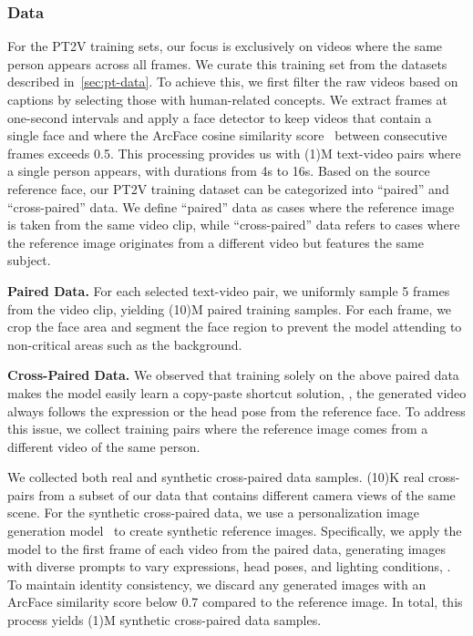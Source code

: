 \subsubsection{\Pretraining Data}
\label{sec:pt2v_pretrain}



For the PT2V training sets, our focus is exclusively on videos where the same person appears across all frames.
We curate this training set from the \OursVideo \pretraining datasets described in~\cref{sec:pt-data}.
To achieve this, we first filter the raw \textToVShort videos based on captions by selecting those with human-related concepts.
We extract frames at one-second intervals and apply a face detector to keep videos that contain a single face and where the ArcFace cosine similarity score~\citep{deng2019arcface} between consecutive frames exceeds 0.5.
This processing provides us with \bigO(1)M text-video pairs where a single person appears, with durations from 4s to 16s.
Based on the source reference face, our PT2V training dataset can be categorized into ``paired'' and ``cross-paired'' data.
We define ``paired'' data as cases where the reference image is taken from the same video clip,
while ``cross-paired'' data refers to cases where the reference image originates from a different video but features the same subject.


\textbf{Paired Data.}
For each selected text-video pair, we uniformly sample 5 frames from the video clip, yielding \bigO(10)M paired training samples.
For each frame, we crop the face area and segment the face region to prevent the model attending to non-critical areas such as the background.


\textbf{Cross-Paired Data.}
We observed that training solely on the above paired data makes the model easily learn a copy-paste shortcut solution,
\ie, the generated video always follows the expression or the head pose from the reference face.
To address this issue, we collect training pairs where the reference image comes from a different video of the same person.

We collected both real and synthetic cross-paired data samples. \bigO(10)K real cross-pairs from a subset of our \pretraining data that contains different camera views of the same scene.
For the synthetic cross-paired data, we use a \pretrained personalization image generation model~\citep{meta24memu} to create synthetic reference images.
Specifically, we apply the model to the first frame of each video from the paired data, generating images with diverse prompts to vary expressions, head poses, and lighting conditions, \etc.
To maintain identity consistency, we discard any generated images with an ArcFace similarity score below 0.7 compared to the reference image.
In total, this process yields \bigO(1)M synthetic cross-paired data samples.


